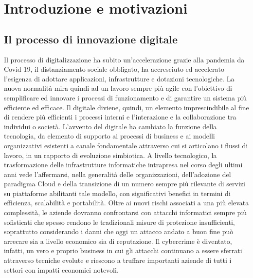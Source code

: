 \listoffigures
\chapter{Introduzione e motivazioni}
\cite{art1}
\section{Il processo di innovazione digitale}
Il processo di digitalizzazione ha subito un’accelerazione grazie alla pandemia da Covid-19, il distanziamento sociale obbligato, ha accresciuto ed accelerato l’esigenza di adottare applicazioni, infrastrutture e dotazioni tecnologiche. La nuova normalità mira quindi ad un lavoro sempre più agile con  l’obiettivo di semplificare ed innovare i processi di funzionamento e di garantire un sistema più efficiente ed efficace. Il digitale diviene, quindi, un elemento imprescindibile al fine di rendere più efficienti i processi interni e l’interazione e la collaborazione tra individui o società. 
L’avvento del digitale ha cambiato la funzione della tecnologia, da elemento di supporto ai processi di business e ai modelli organizzativi esistenti a canale fondamentale attraverso cui si articolano i flussi di lavoro, in un rapporto di evoluzione simbiotica. 
A livello tecnologico, la trasformazione delle infrastrutture informatiche intrapresa nel corso degli ultimi anni vede l’affermarsi, nella generalità delle organizzazioni, dell’adozione del paradigma Cloud e della transizione di un numero sempre più rilevante di servizi su piattaforme abilitanti tale modello, con significativi benefici in termini di efficienza, scalabilità e portabilità.
Oltre ai nuovi rischi associati a una più elevata complessità, le aziende dovranno confrontarsi con attacchi informatici sempre più sofisticati che spesso rendono le tradizionali misure di protezione insufficienti, soprattutto considerando i danni che oggi un attacco andato a buon fine può arrecare sia a livello economico sia di reputazione. Il cybercrime è diventato, infatti, un vero e proprio business in cui gli attacchi continuano a essere sferrati attraverso tecniche evolute e riescono a truffare importanti aziende di tutti i settori con impatti economici notevoli.
